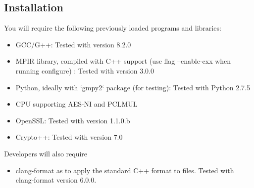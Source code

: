 
\subsection{Installation}
You will require the following previously loaded programs and 
libraries:
\begin{itemize}
\item GCC/G++: Tested with version 8.2.0 
\item MPIR library, compiled with C++ support (use flag --enable-cxx when running configure) : Tested with version 3.0.0
\item Python, ideally with `gmpy2` package (for testing): Tested with Python 2.7.5
\item CPU supporting AES-NI and PCLMUL
\item OpenSSL: Tested with version 1.1.0.b
\item Crypto++: Tested with version 7.0
\end{itemize}
Developers will also require
\begin{itemize}
\item clang-format as to apply the standard C++ format to files. Tested with clang-format version 6.0.0.
\end{itemize}

